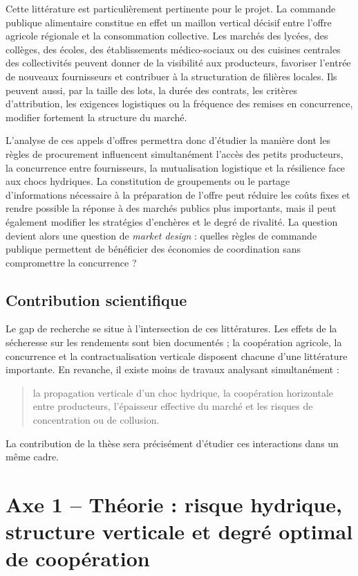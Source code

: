 \documentclass[11pt,a4paper]{article}
\begin{document}
Cette littérature est particulièrement pertinente pour le projet. La commande publique alimentaire constitue en effet un maillon vertical décisif entre l'offre agricole régionale et la consommation collective. Les marchés des lycées, des collèges, des écoles, des établissements médico-sociaux ou des cuisines centrales des collectivités peuvent donner de la visibilité aux producteurs, favoriser l'entrée de nouveaux fournisseurs et contribuer à la structuration de filières locales. Ils peuvent aussi, par la taille des lots, la durée des contrats, les critères d'attribution, les exigences logistiques ou la fréquence des remises en concurrence, modifier fortement la structure du marché.

L'analyse de ces appels d'offres permettra donc d'étudier la manière dont les règles de procurement influencent simultanément l'accès des petits producteurs, la concurrence entre fournisseurs, la mutualisation logistique et la résilience face aux chocs hydriques. La constitution de groupements ou le partage d'informations nécessaire à la préparation de l'offre peut réduire les coûts fixes et rendre possible la réponse à des marchés publics plus importants, mais il peut également modifier les stratégies d'enchères et le degré de rivalité. La question devient alors une question de \textit{market design} : quelles règles de commande publique permettent de bénéficier des économies de coordination sans compromettre la concurrence ?

\subsection*{Contribution scientifique}

Le gap de recherche se situe à l'intersection de ces littératures. Les effets de la sécheresse sur les rendements sont bien documentés ; la coopération agricole, la concurrence et la contractualisation verticale disposent chacune d'une littérature importante. En revanche, il existe moins de travaux analysant simultanément :

\begin{quote}
la propagation verticale d'un choc hydrique, la coopération horizontale entre producteurs, l'épaisseur effective du marché et les risques de concentration ou de collusion.
\end{quote}

La contribution de la thèse sera précisément d'étudier ces interactions dans un même cadre.

\section{Axe 1 -- Théorie : risque hydrique, structure verticale et degré optimal de coopération}
\end{document}
